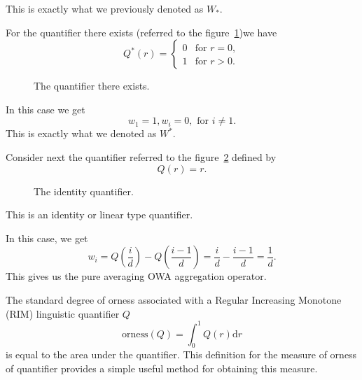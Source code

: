 This is exactly what we previously denoted as $W_{\ast}$.

For the quantifier there exists (referred to the figure~\ref{pig:owa9})we have 
\[Q^{\ast}(r) = \left\{
\begin{matrix}
0 & \text{for } r=0,\\
1 & \text{for } r>0.
\end{matrix}\right.\]
\begin{figure}[h]
\vspace{.2in}
\caption{The quantifier there exists.}
\label{pig:owa9}
\end{figure}

In this case we get 
\[w_1 = 1, w_i = 0, \text{  for } i\neq 1.\]
This is exactly what we denoted as $W^{\ast}$.

Consider next the quantifier referred to the figure~\ref{pig:owa10} defined by 
\[Q(r) = r.\]
\begin{figure}[h]
\vspace{.2in}
\caption{The identity quantifier.}
\label{pig:owa10}
\end{figure}
This is an identity or linear type quantifier.

In this case, we get
\[w_i = Q(\frac{i}{d})-Q(\frac{i-1}{d}) = \frac{i}{d} - \frac{i-1}{d} = \frac{1}{d}.\]
This gives us the pure averaging OWA aggregation operator.

The standard degree of orness associated with a Regular Increasing Monotone (RIM) linguistic quantifier $Q$
\[\text{orness}(Q) = \int_0^1Q(r)\mathrm{d}r\]
is equal to the area under the quantifier\cite{yager1996quantifier}. This definition for the measure of orness of quantifier provides a simple useful method for obtaining this measure. 